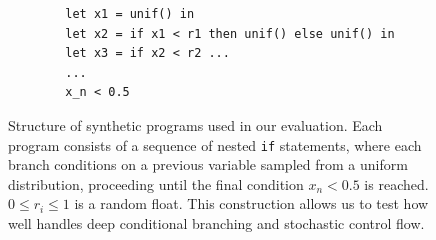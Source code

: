\begin{figure}[h]
    \centering
    \begin{lstlisting}
        let x1 = unif() in 
        let x2 = if x1 < r1 then unif() else unif() in 
        let x3 = if x2 < r2 ...
        ...
        x_n < 0.5
    \end{lstlisting}
    \caption{Structure of synthetic programs used in our evaluation. Each program consists of a sequence of nested \texttt{if} statements, where each branch conditions on a previous variable sampled from a uniform distribution, proceeding until the final condition $x_n < 0.5$ is reached. $0 \leq r_i \leq 1$ is a random float. This construction allows us to test how well \Slice{} handles deep conditional branching and stochastic control flow.}
    \label{fig:nested-conditionals}
    \end{figure}